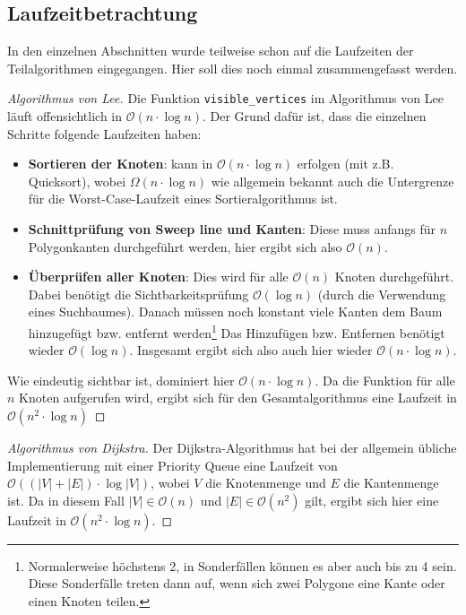 \documentclass[a4paper, notitlepage, 12pt]{scrartcl}
\begin{document}
 \subsection{Laufzeitbetrachtung}
 In den einzelnen Abschnitten wurde teilweise schon auf die Laufzeiten der Teilalgorithmen eingegangen. Hier soll dies noch einmal zusammengefasst werden.
 \begin{proof}[Algorithmus von Lee]
 	Die Funktion \texttt{visible\_vertices} im Algorithmus von Lee läuft offensichtlich in $\mathcal{O}(n \cdot \log n)$. Der Grund dafür ist, dass die einzelnen Schritte folgende Laufzeiten haben:
 	\begin{itemize}
 		\item \textbf{Sortieren der Knoten}: kann in $\mathcal{O}(n \cdot \log n)$ erfolgen (mit z.B. Quicksort), wobei $\Omega(n \cdot \log n)$ wie allgemein bekannt auch die Untergrenze für die Worst-Case-Laufzeit eines Sortieralgorithmus ist.
 		\item  \textbf{Schnittprüfung von Sweep line und Kanten}: Diese muss anfangs für $n$ Polygonkanten durchgeführt werden, hier ergibt sich also $\mathcal{O}(n)$.
 		\item  \textbf{Überprüfen aller Knoten}: Dies wird für alle $\mathcal{O}(n)$ Knoten durchgeführt. Dabei benötigt die Sichtbarkeitsprüfung $\mathcal{O}(\log n)$ (durch die Verwendung eines Suchbaumes). Danach müssen noch konstant viele Kanten dem Baum hinzugefügt bzw. entfernt werden\footnote{Normalerweise höchstens 2, in Sonderfällen können es aber auch bis zu 4 sein. Diese Sonderfälle treten dann auf, wenn sich zwei Polygone eine Kante oder einen Knoten teilen.} Das Hinzufügen bzw. Entfernen benötigt wieder $\mathcal{O}(\log n)$. Insgesamt ergibt sich also auch hier wieder $\mathcal{O}(n \cdot \log n)$.
 	\end{itemize}
 	Wie eindeutig sichtbar ist, dominiert hier $\mathcal{O}(n \cdot \log n)$. Da die Funktion für alle $n$ Knoten aufgerufen wird, ergibt sich für den Gesamtalgorithmus eine Laufzeit in $\mathcal{O}(n^2 \cdot \log n)$
 \end{proof}
\begin{proof}[Algorithmus von Dijkstra]
	Der Dijkstra-Algorithmus hat bei der allgemein übliche Implementierung mit einer Priority Queue eine Laufzeit von $\mathcal{O}((|V|+|E|) \cdot \log |V|)$, wobei $V$ die Knotenmenge und $E$ die Kantenmenge ist. Da in diesem Fall $|V| \in \mathcal{O}(n)$ und $|E| \in \mathcal{O}(n^2)$ gilt, ergibt sich hier eine Laufzeit in $\mathcal{O}(n^2 \cdot \log n)$.
\end{proof}
\end{document}
